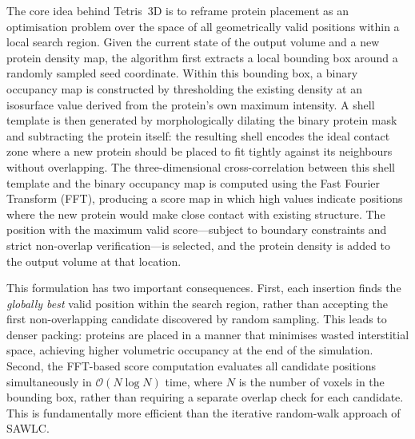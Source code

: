 The core idea behind Tetris~3D is to reframe protein placement as an optimisation problem over
the space of all geometrically valid positions within a local search region. Given the current
state of the output volume and a new protein density map, the algorithm first extracts a local
bounding box around a randomly sampled seed coordinate. Within this bounding box, a binary
occupancy map is constructed by thresholding the existing density at an isosurface value derived
from the protein's own maximum intensity. A shell template is then generated by morphologically
dilating the binary protein mask and subtracting the protein itself: the resulting shell encodes
the ideal contact zone where a new protein should be placed to fit tightly against its neighbours
without overlapping. The three-dimensional cross-correlation between this shell template and the
binary occupancy map is computed using the Fast Fourier Transform (FFT), producing a score map
in which high values indicate positions where the new protein would make close contact with
existing structure. The position with the maximum valid score—subject to boundary constraints
and strict non-overlap verification—is selected, and the protein density is added to the output
volume at that location.

This formulation has two important consequences. First, each insertion finds the \textit{globally
best} valid position within the search region, rather than accepting the first non-overlapping
candidate discovered by random sampling. This leads to denser packing: proteins are placed in
a manner that minimises wasted interstitial space, achieving higher volumetric occupancy at the
end of the simulation. Second, the FFT-based score computation evaluates all candidate positions
simultaneously in $\mathcal{O}(N \log N)$ time, where $N$ is the number of voxels in the
bounding box, rather than requiring a separate overlap check for each candidate. This is
fundamentally more efficient than the iterative random-walk approach of SAWLC.

